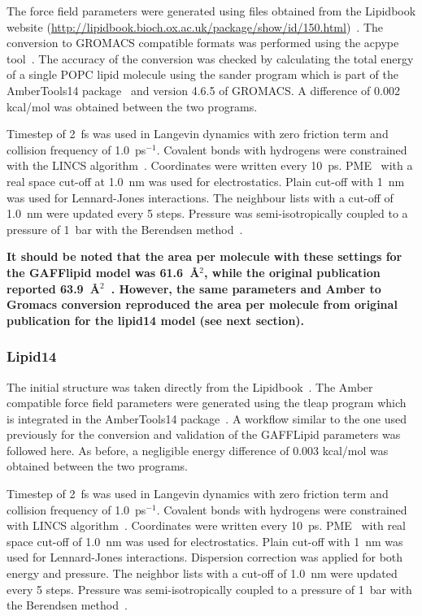 \documentclass[pre,aps,floatfix,authordate1-4,twocolumn]{revtex4-1}
\begin{document}
The force field parameters were generated using files obtained from the Lipidbook website (\url{http://lipidbook.bioch.ox.ac.uk/package/show/id/150.html})~\cite{domanski10}. 
The conversion to GROMACS compatible formats was performed using the acpype tool~\cite{silva12}. The accuracy of the conversion was checked by calculating 
the total energy of a single POPC lipid molecule using the sander program which is part of the AmberTools14 package~\cite{ferrer13} and version 4.6.5 of GROMACS. 
A difference of 0.002 kcal/mol was obtained between the two programs.

Timestep of 2~fs was used in Langevin dynamics with zero friction term and collision frequency of 1.0~ps$^{-1}$. 
Covalent bonds with hydrogens were constrained with the LINCS algorithm~\cite{hess97,hess07}.
Coordinates were written every 10~ps. PME~\cite{darden93,essman95} with a real space cut-off at 1.0~nm was used 
for electrostatics. Plain cut-off with 1~nm was used for Lennard-Jones interactions. 
The neighbour lists with a cut-off of 1.0~nm were updated every 5 steps. 
Pressure was semi-isotropically coupled to a pressure of 1~bar with the Berendsen method~\cite{berendsen84}.

{\bf It should be noted that the area per molecule with these settings for the GAFFlipid model was 61.6~\AA$^2$,
while the original publication reported 63.9~\AA$^2$~\cite{dickson12}. However, the same parameters and Amber to Gromacs
conversion reproduced the area per molecule from original publication for the lipid14 model (see next section).}

\subsubsection{Lipid14}
The initial structure was taken directly from the Lipidbook~\cite{domanski10}.
The Amber compatible force field parameters were generated using the tleap program which is integrated in the AmberTools14 package~\cite{ferrer13}. 
A workflow similar to the one used previously for the conversion and validation of the GAFFLipid parameters was followed here. 
As before, a negligible energy difference of 0.003 kcal/mol was obtained between the two programs.

Timestep of 2~fs was used in Langevin dynamics with zero friction term and collision frequency of 1.0~ps$^{-1}$. 
Covalent bonds with hydrogens were constrained with LINCS algorithm~\cite{hess97,hess07}.
Coordinates were written every 10~ps. PME~\cite{darden93,essman95} with real space cut-off of 1.0~nm was used 
for electrostatics. Plain cut-off with 1~nm was used for Lennard-Jones interactions. Dispersion correction
was applied for both energy and pressure. The neighbor lists with a cut-off of 1.0~nm were updated every 5 steps. 
Pressure was semi-isotropically coupled to a pressure of 1~bar with the Berendsen method~\cite{berendsen84}.
\end{document}
